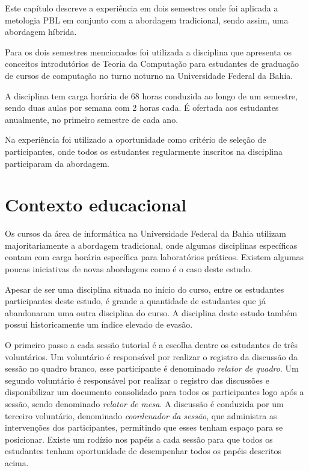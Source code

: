 
\label{cap-experiencia}
\acresetall

Este capítulo descreve a experiência em dois semestres onde foi aplicada a metologia PBL
em conjunto com a abordagem tradicional, sendo assim, uma abordagem híbrida.

Para os dois semestres mencionados foi utilizada a disciplina que apresenta os
conceitos introdutórios de Teoria da Computação para estudantes de graduação de cursos de computação
no turno noturno na Universidade Federal da Bahia.

A disciplina tem carga horária de 68 horas conduzida ao longo de um semestre, sendo duas
aulas por semana com 2 horas cada.
É ofertada aos estudantes anualmente, no primeiro semestre de cada ano.

Na experiência foi utilizado a oportunidade como critério de seleção de participantes, onde todos os
estudantes regularmente inscritos na disciplina participaram da abordagem.

\section{Contexto educacional}
Os cursos da área de informática na Universidade Federal da Bahia
utilizam majoritariamente a abordagem tradicional, onde
algumas disciplinas específicas contam com carga horária específica
para laboratórios práticos.
Existem algumas poucas iniciativas de novas abordagens como é
o caso deste estudo.

Apesar de ser uma disciplina situada no início do
curso, entre os estudantes participantes deste estudo,
é grande a quantidade de estudantes que já abandonaram uma
outra disciplina do curso.
A disciplina deste estudo também possui historicamente um índice
elevado de evasão.



O primeiro passo a cada sessão tutorial é a escolha dentre os
estudantes de três voluntários.
Um voluntário é responsável por realizar o registro da discussão
da sessão no quadro branco, esse
participante é denominado \textit{relator de quadro}.
Um segundo voluntário é responsável por realizar o registro
das discussões e disponibilizar um documento consolidado para todos
os participantes logo após
a sessão, sendo denominado \textit{relator de mesa}.
A discussão é conduzida por um terceiro voluntário,
denominado \textit{coordenador da sessão}, que administra
as intervenções dos participantes, permitindo que esses
tenham espaço para se posicionar.
Existe um rodízio nos papéis a cada sessão para que todos
os estudantes tenham oportunidade de desempenhar todos
os papéis descritos acima.

